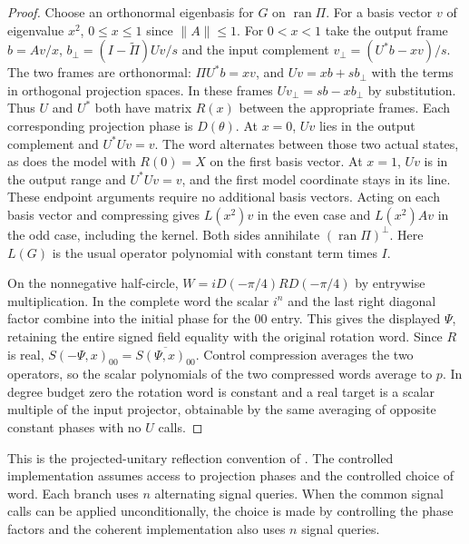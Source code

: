 \documentclass[11pt,reqno]{amsart}
\theoremstyle{definition}
\theoremstyle{remark}
\numberwithin{equation}{section}
\begin{document}
\begin{proof}
Choose an orthonormal eigenbasis for $G$ on $\operatorname{ran}\Pi$. For a basis vector $v$ of eigenvalue $x^2$, $0\le x\le1$ since $\|A\|\le1$. For $0<x<1$ take the output frame $b=Av/x$, $b_\perp=(I-\widetilde\Pi)Uv/s$ and the input complement $v_\perp=(U^*b-xv)/s$. The two frames are orthonormal: $\Pi U^*b=xv$, and $Uv=xb+sb_\perp$ with the terms in orthogonal projection spaces. In these frames $Uv_\perp=sb-xb_\perp$ by substitution. Thus $U$ and $U^*$ both have matrix $R(x)$ between the appropriate frames. Each corresponding projection phase is $D(\theta)$. At $x=0$, $Uv$ lies in the output complement and $U^*Uv=v$. The word alternates between those two actual states, as does the model with $R(0)=X$ on the first basis vector. At $x=1$, $Uv$ is in the output range and $U^*Uv=v$, and the first model coordinate stays in its line. These endpoint arguments require no additional basis vectors. Acting on each basis vector and compressing gives $L(x^2)v$ in the even case and $L(x^2)Av$ in the odd case, including the kernel. Both sides annihilate $(\operatorname{ran}\Pi)^\perp$. Here $L(G)$ is the usual operator polynomial with constant term times $I$.

On the nonnegative half-circle, $W=iD(-\pi/4)R D(-\pi/4)$ by entrywise multiplication. In the complete word the scalar $i^n$ and the last right diagonal factor combine into the initial phase for the $00$ entry. This gives the displayed $\Psi$, retaining the entire signed field equality with the original rotation word. Since $R$ is real, $S(-\Psi,x)_{00}=\overline{S(\Psi,x)_{00}}$. Control compression averages the two operators, so the scalar polynomials of the two compressed words average to $p$. In degree budget zero the rotation word is constant and a real target is a scalar multiple of the input projector, obtainable by the same averaging of opposite constant phases with no $U$ calls.
\end{proof}

This is the projected-unitary reflection convention of \cite[Corollary 8, Theorem 17 and Corollary 18, arXiv v1]{m4:GSLW}. The controlled implementation assumes access to projection phases and the controlled choice of word. Each branch uses $n$ alternating signal queries. When the common signal calls can be applied unconditionally, the choice is made by controlling the phase factors and the coherent implementation also uses $n$ signal queries.
\end{document}
